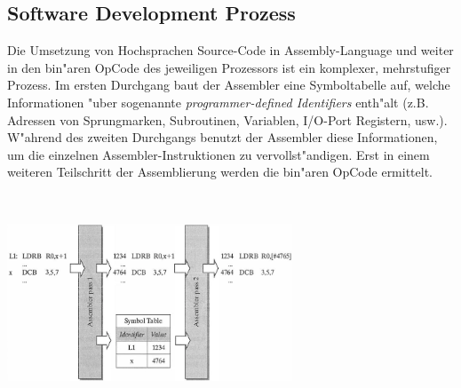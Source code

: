 \subsection{Software Development Prozess}
\begin{minipage}{9.5cm}
	Die Umsetzung von Hochsprachen Source-Code in Assembly-Language und weiter in den bin"aren OpCode des jeweiligen Prozessors ist ein komplexer, mehrstufiger Prozess. Im ersten Durchgang  baut der Assembler eine Symboltabelle auf, welche Informationen "uber sogenannte \textit{programmer-defined Identifiers} enth"alt (z.B. Adressen von Sprungmarken, Subroutinen, Variablen, I/O-Port Registern, usw.). W"ahrend des zweiten Durchgangs benutzt der Assembler diese Informationen, um die einzelnen Assembler-Instruktionen zu vervollst"andigen. Erst in einem weiteren Teilschritt der Assemblierung werden die bin"aren OpCode ermittelt.
\end{minipage}
%
\begin{minipage}{0.5cm}
	\-\
\end{minipage}
%
\begin{minipage}{8.5cm}
	\includegraphics[width=8.5cm]{images/SoftwareDevelopmentProzess}
\end{minipage}

